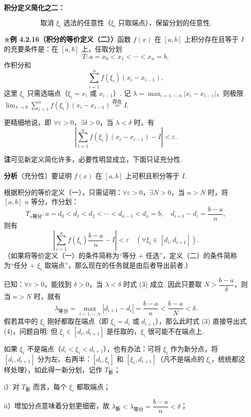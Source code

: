 \documentclass[UTF8,12pt,a4paper,fontset=fandol]{ctexart}
\begin{document}
\noindent\textbf{积分定义简化之二：}

\[
\text{取消 $\xi_i$ 选法的任意性（$\xi_i$ 只取端点），保留分划的任意性.}
\]

\noindent\textbf{※例 4.2.16（积分的等价定义（二））}\quad 函数 $f(x)$ 在 $[a,b]$ 上积分存在且等于 $I$ 的充要条件是：在 $[a,b]$ 上，任取分划
\[
T:a=x_0<x_1<\cdots<x_n=b,
\tag{1}
\]
作积分和
\[
\sum_{i=1}^n f(\xi_i)(x_i-x_{i-1}),
\tag{2}
\]
这里 $\xi_i$ 只需选端点（$\xi_i=x_i$ 或 $x_{i-1}$）. 记 $\lambda=\max_{i=1,\cdots,n}|x_i-x_{i-1}|$，则极限 $\lim_{\lambda\to0}\sum_{i=1}^n f(\xi_i)(x_i-x_{i-1})\stackrel{\text{存在}}{=}I$.

更精细地说，即 $\forall\varepsilon>0$，$\exists\delta>0$，当 $\lambda<\delta$ 时，有
\[
\left|\sum_{i=1}^n f(\xi_i)(x_i-x_{i-1})-I\right|<\varepsilon.
\tag{3}
\]

\noindent\textbf{注}\quad 可见新定义简化许多，必要性明显成立，下面只证充分性.

\noindent\textbf{分析}\quad （充分性）要证明 $f(x)$ 在 $[a,b]$ 上可积且积分等于 $I$.

根据积分的等价定义（一），只需证明：$\forall\varepsilon>0$，$\exists N>0$，当 $n>N$ 时，将 $[a,b]$ $n$ 等分，作分划：
\[
T_{n\text{等分}}:a=d_0<d_1<d_2<\cdots<d_{n-1}<d_n=b,\quad d_{i+1}-d_i=\frac{b-a}{n},
\]
则有
\[
\left|\sum_{i=1}^n f(\xi_i)\frac{b-a}{n}-I\right|<\varepsilon\quad(\forall\xi_i\in[d_i,d_{i+1}]).
\tag{4}
\]
（如果将等价定义（一）的条件简称为“等分 + 任选”，定义（二）的条件简称为“任分 + $\xi_i$ 取端点”，那么现在的任务就是由后者导出前者.）

已知：$\forall\varepsilon>0$，能找到 $\delta>0$，当 $\lambda<\delta$ 时式 (3) 成立. 因此只要取 $N>\dfrac{b-a}{\delta}$，则当 $n>N$ 时，就有
\[
\lambda_{\text{等分}}=\max_{i=1,\cdots,n}|d_{i+1}-d_i|=\frac{b-a}{n}<\frac{b-a}{N}<\delta.
\]
假若其中的 $\xi_i$ 刚好都取在端点（即 $\xi_i=d_i$ 或 $d_{i+1}$），那么此时式 (3) 直接导出式 (4)，问题自明. 但 $\xi_i\in[d_i,d_{i+1}]$ 是任取的，$\xi_i$ 很可能不在端点上.

如果 $\xi_i$ 不是端点（$d_i<\xi_i<d_{i+1}$），也有办法：可将 $\xi_i$ 作为新分点，将 $[d_i,d_{i+1}]$ 分为左、右两半：$[d_i,\xi_i]$ 和 $[\xi_i,d_{i+1}]$（凡不是端点的 $\xi_i$，统统都这样处理），如此得一新分划，记作 $T_{\text{新}}$；

i）对 $T_{\text{新}}$ 而言，每个 $\xi_i$ 都取端点；

ii）增加分点意味着分划更细密，故 $\lambda_{\text{新}}<\lambda_{\text{等分}}=\dfrac{b-a}{n}<\delta$；
\end{document}
